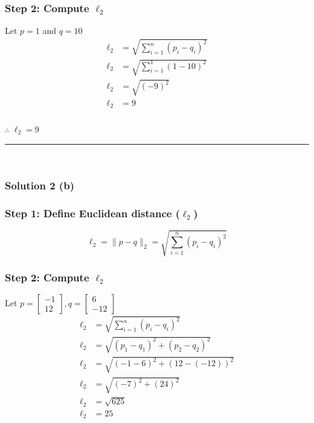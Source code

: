 \documentclass{article}
\begin{document}
\subsubsection*{Step 2: Compute $\ell_2$}
\parbox{\textwidth}{
Let $p=1$ and $q=10$
$$
\begin{aligned}
\ell_2 &= \sqrt{\sum_{i=1}^{n} (p_i - q_i)^2}\\
\ell_2 &= \sqrt{\sum_{i=1}^{1} (1 - 10)^2}\\
\ell_2 &= \sqrt{(- 9)^2}\\
\ell_2 &= 9
\end{aligned}
$$
}
\subsubsection*{\normalfont}{$\therefore$ $\ell_{2} = 9$}

\noindent\rule{\textwidth}{0.4pt}\\

\subsubsection*{Solution 2 (b)}
\subsubsection*{Step 1: Define Euclidean distance ($\ell_2$)}
\parbox{\textwidth}{

$$\ell_2 = \|p - q\|_2 = \sqrt{\sum_{i=1}^{n} (p_i - q_i)^2}$$

}

\subsubsection*{Step 2: Compute $\ell_2$}
\parbox{\textwidth}{
Let $p = \begin{bmatrix} -1 \\ 12 \end{bmatrix}, q = \begin{bmatrix} 6 \\ -12 \end{bmatrix}$
$$
\begin{aligned}
\ell_2 &= \sqrt{\sum_{i=1}^{n} (p_i - q_i)^2}\\
\ell_2 &= \sqrt{(p_1 - q_1)^{2}+(p_2 - q_2)^{2}}\\
\ell_2 &= \sqrt{(-1 - 6)^{2}+(12 - (-12))^{2}}\\
\ell_2 &= \sqrt{(-7)^{2}+(24)^{2}}\\
\ell_2 &= \sqrt{625}\\
\ell_2 &= 25
\end{aligned}
$$
}
\end{document}
